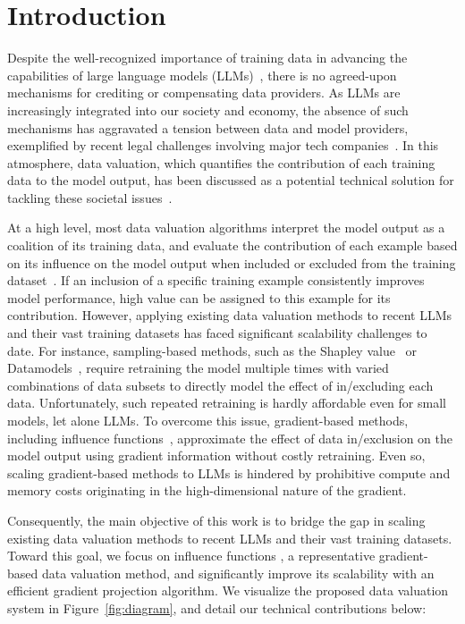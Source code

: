 \section{Introduction}
Despite the well-recognized importance of training data in advancing the capabilities of large language models (LLMs)~\cite{brown2020language,kaplan2020scaling,Razeghi2022ImpactOP}, there is no agreed-upon mechanisms for crediting or compensating data providers. As LLMs are increasingly integrated into our society and economy, the absence of such mechanisms has aggravated a tension between data and model providers, exemplified by recent legal challenges involving major tech companies~\cite{jlversusalphabet,metz2022lawsuit}. In this atmosphere, data valuation, which quantifies the contribution of each training data to the model output, has been discussed as a potential technical solution for tackling these societal issues~\cite{fernandez2023data,ghorbani2019data,huang2023citation,jia2019towards,worledge2023unifying,zhao2023addressing}. 

At a high level, most data valuation algorithms interpret the model output as a coalition of its training data, and evaluate the contribution of each example based on its influence on the model output when included or excluded from the training dataset~\cite{ghorbani2019data,ilyas2022datamodels,koh2017understanding,kwon2021beta}. If an inclusion of a specific training example consistently improves model performance, high value can be assigned to this example for its contribution. However, applying existing data valuation methods to recent LLMs and their vast training datasets has faced significant scalability challenges to date. For instance, sampling-based methods, such as the Shapley value~\cite{ghorbani2019data,kwon2021beta} or Datamodels~\cite{ilyas2022datamodels}, require retraining the model multiple times with varied combinations of data subsets to directly model the effect of in/excluding each data. Unfortunately, such repeated retraining is hardly affordable even for small models, let alone LLMs. To overcome this issue, gradient-based methods, including influence functions~\cite{koh2017understanding,park2023trak}, approximate the effect of data in/exclusion on the model output using gradient information without costly retraining. Even so, scaling gradient-based methods to LLMs is hindered by prohibitive compute and memory costs originating in the high-dimensional nature of the gradient.

Consequently, the main objective of this work is to bridge the gap in scaling existing data valuation methods to recent LLMs and their vast training datasets. Toward this goal, we focus on influence functions \cite{koh2017understanding,park2023trak}, a representative gradient-based data valuation method, and significantly improve its scalability with an efficient gradient projection algorithm. We visualize the proposed data valuation system in Figure~\ref{fig:diagram}, and detail our technical contributions below:

